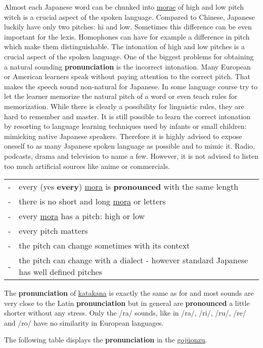 Almost each Japanese word can be chunked into \hyperref[sec:Mora]{morae} of
high and low pitch witch is a crucial aspect of the spoken language. Compared
to Chinese, Japanese luckily have only two pitches: hi and low. Sometimes this
difference can be even important for the lexis. Homophones can have for example
a difference in pitch which make them distinguishable.  The intonation of high
and low pitches is a crucial aspect of the spoken language. One of the biggest
problems for obtaining a natural sounding \textbf{pronunciation} is the
incorrect intonation. Many European or American learners speak without paying
attention to the correct pitch. That makes the speech sound non-natural for
Japanese. In some language course try to let the learner memorize the natural
pitch of a word or even teach rules for memorization. While there is clearly a
possibility for linguistic rules, they are hard to remember and master.  It is
still possible to learn the correct intonation by resorting to language
learning techniques used by infants or small children: mimicking native
Japanese speakers. Therefore it is highly advised to expose oneself to as many
Japanese spoken language as possible and to mimic it. Radio, podcasts, drama
and television to name a few. However, it is not advised to listen too much
artificial sources like anime or commercials.

\bigskip
\begin{tabular}{rl}
-&every (yes \textbf{every}) \hyperref[sec:Mora]{mora} is \textbf{pronounced}
  with the same length\\
-&there is no short and long \hyperref[sec:Mora]{mora} or letters\\
-&every \hyperref[sec:Mora]{mora} has a pitch: high or low\\
-&every pitch matters\\
-&the pitch can change  sometimes with its context\\
-&the pitch can change with a dialect - however standard Japanese has well
  defined pitches\\
\end{tabular}

\bigskip

The \textbf{pronunciation} of \hyperref[sec:Katakana]{katakana} is exactly the
same as for \hyperref[sec:\jscript]{\jtopic} and most sounds are very close to
the Latin \textbf{pronunciation} but in general are \textbf{pronounced} a
little shorter without any stress. Only the /ra/ sounds, like in /ra/, /ri/,
/ru/, /re/ and /ro/ have no similarity in European languages.



The following table displays the \textbf{pronunciation} in the
\hyperref[sec:Gojuonzu]{gojūonzu}.



